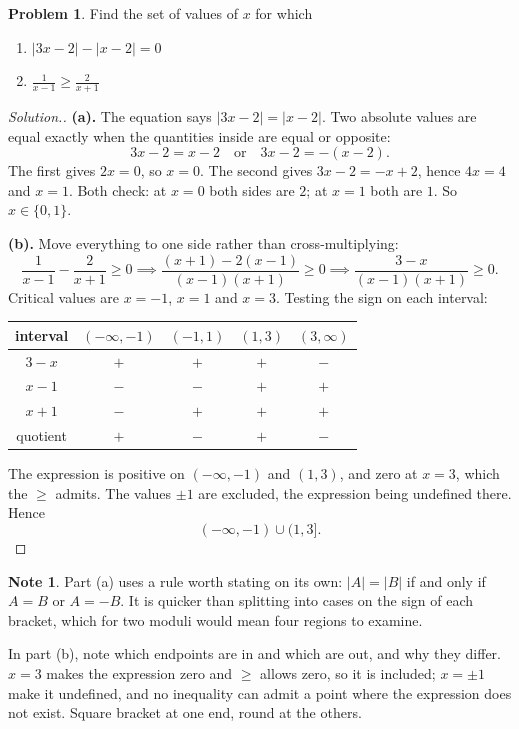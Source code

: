 \documentclass[11pt,a4paper]{article}
\theoremstyle{definition}
\newtheorem{note}[thm]{Note}
\newtheorem{problemx}{Problem}[section]
\newenvironment{problem}{\begin{problemx}}{\end{problemx}}
\newenvironment{solution}
  {\renewcommand{\qedsymbol}{}\begin{proof}[\textit{Solution}.]}
  {\end{proof}}
\begin{document}
\pagebreak

\begin{problem}
Find the set of values of $x$ for which
\begin{enumerate}
\item[(a).] $\left|3x-2\right|-\left|x-2\right|=0$
\item[(b).] $\frac{1}{x-1}\geq\frac{2}{x+1}$
\end{enumerate}
\end{problem}

\begin{solution}
\textbf{(a).} The equation says $\left|3x-2\right|=\left|x-2\right|$. Two absolute
values are equal exactly when the quantities inside are equal or opposite:
$$3x-2=x-2 \quad \text{or}\quad  3x-2=-(x-2).$$
The first gives $2x=0$, so $x=0$. The second gives $3x-2=-x+2$, hence $4x=4$ and
$x=1$. Both check: at $x=0$ both sides are $2$; at $x=1$ both are $1$. So
$x\in\{0,1\}$.

\textbf{(b).} Move everything to one side rather than cross-multiplying:
$$\frac{1}{x-1}-\frac{2}{x+1}\geq 0
\implies \frac{(x+1)-2(x-1)}{(x-1)(x+1)}\geq 0
\implies \frac{3-x}{(x-1)(x+1)}\geq 0 .$$
Critical values are $x=-1$, $x=1$ and $x=3$. Testing the sign on each interval:

\begin{table}[H]
\centering
\begin{tabular}{c|cccc}
interval & $(-\infty,-1)$ & $(-1,1)$ & $(1,3)$ & $(3,\infty)$\\
\hline
$3-x$ & $+$ & $+$ & $+$ & $-$\\
$x-1$ & $-$ & $-$ & $+$ & $+$\\
$x+1$ & $-$ & $+$ & $+$ & $+$\\
\hline
quotient & $+$ & $-$ & $+$ & $-$\\
\end{tabular}
\end{table}

The expression is positive on $(-\infty,-1)$ and $(1,3)$, and zero at $x=3$, which
the $\geq$ admits. The values $\pm 1$ are excluded, the expression being undefined
there. Hence
$$(-\infty,-1)\cup(1,3] .$$
\end{solution}

\begin{note}
Part (a) uses a rule worth stating on its own: $\left|A\right|=\left|B\right|$ if
and only if $A=B$ or $A=-B$. It is quicker than splitting into cases on the sign of
each bracket, which for two moduli would mean four regions to examine.

In part (b), note which endpoints are in and which are out, and why they differ.
$x=3$ makes the expression zero and $\geq$ allows zero, so it is included; $x=\pm1$
make it undefined, and no inequality can admit a point where the expression does
not exist. Square bracket at one end, round at the others.
\end{note}
\end{document}
